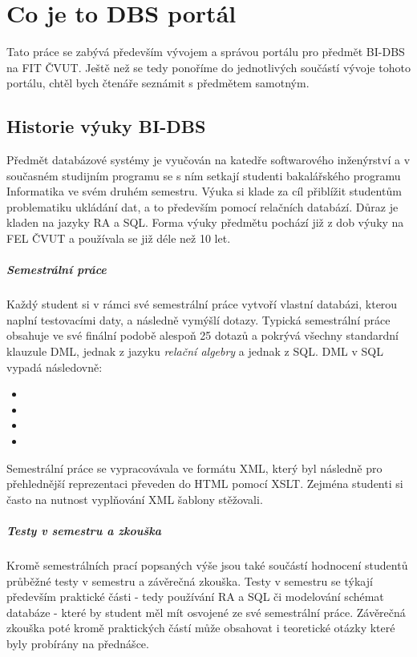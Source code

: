 \chapter{Co je to DBS portál} \label{DBSportal}

Tato práce se zabývá především vývojem a správou portálu pro předmět BI-DBS na FIT ČVUT. Ještě než se tedy ponoříme do jednotlivých součástí vývoje tohoto portálu, chtěl bych čtenáře seznámit s předmětem samotným.

\section{Historie výuky BI-DBS}

Předmět databázové systémy je vyučován na katedře softwarového inženýrství a v současném studijním programu se s ním setkají studenti bakalářského programu Informatika ve svém druhém semestru. Výuka si klade za cíl přiblížit studentům problematiku ukládání dat, a to především pomocí relačních databází. Důraz je kladen na jazyky RA a SQL. Forma výuky předmětu pochází již z dob výuky na FEL ČVUT a používala se již déle než 10 let.

\paragraph{Semestrální práce}
Každý student si v rámci své semestrální práce vytvoří vlastní databázi, kterou naplní testovacími daty, a následně vymýšlí dotazy. Typická semestrální práce obsahuje ve své finální podobě alespoň 25 dotazů a pokrývá všechny standardní klauzule DML, jednak z jazyku \emph{relační algebry} a jednak z SQL. DML v SQL vypadá následovně:
\begin{itemize}
	\item {}
	\item {}
	\item {}
	\item {}
\end{itemize}
Semestrální práce se vypracovávala ve formátu XML, který byl následně pro přehlednější reprezentaci převeden do HTML pomocí XSLT. Zejména studenti si často na nutnost vyplňování XML šablony stěžovali.

\paragraph{Testy v semestru a zkouška}
Kromě semestrálních prací popsaných výše jsou také součástí hodnocení studentů průběžné testy v semestru a závěrečná zkouška. Testy v semestru se týkají především praktické části - tedy používání RA a SQL či modelování schémat databáze - které by student měl mít osvojené ze své semestrální práce. Závěrečná zkouška poté kromě praktických částí může obsahovat i teoretické otázky které byly probírány na přednášce.

